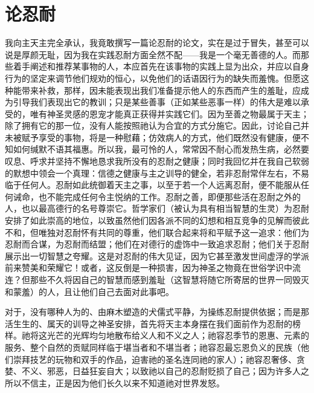 
\chapter{论忍耐}



我向主天主完全承认，我竟敢撰写一篇论忍耐的论文，实在是过于冒失，甚至可以说是厚颜无耻，因为我在实践忍耐方面全然不配——我是一个毫无善德的人。而那些着手阐述和推荐某事物的人，本应首先在该事物的实践上显为出众，并应以自身行为的坚定来调节他们规劝的恒心，以免他们的话语因行为的缺失而羞愧。但愿这种能带来补救，那样，因未能表现出我们准备提示他人的东西而产生的羞耻，应成为引导我们表现出它的教训；只是某些善事（正如某些恶事一样）的伟大是难以承受的，唯有神圣灵感的恩宠才能真正获得并实践它们。因为至善之物最属于天主；除了拥有它的那一位，没有人能按照祂认为合宜的方式分施它。因此，讨论自己并未被赋予享受的事物，将是一种慰藉；仿效病人的方式，他们既然没有健康，便不知如何缄默不语其福惠。所以我，最可怜的人，常常因不耐心而发热生病，必然要叹息、呼求并坚持不懈地恳求我所没有的忍耐之健康；同时我回忆并在我自己软弱的默想中领会一个真理：信德之健康与主之训导的健全，若非忍耐常伴左右，不易临于任何人。忍耐如此统御着天主之事，以至于若一个人远离忍耐，便不能服从任何诫命，也不能完成任何令主悦纳的工作。忍耐之善，即便那些活在忍耐之外的人，也以最高德行的名号尊崇它。哲学家们（被认为具有相当智慧的生灵）为忍耐安排了如此崇高的地位，以致虽然他们因各派不同的幻想和相互竞争的见解而彼此不和，但唯独对忍耐怀有共同的尊重，他们联合起来将和平赋予这一追求：他们为忍耐而合谋，为忍耐而结盟；他们在对德行的虚饰中一致追求忍耐；他们关于忍耐展示出一切智慧之夸耀。这是对忍耐的伟大见证，因为它甚至激发世间虚浮的学派前来赞美和荣耀它！或者，这反倒是一种损害，因为神圣之物竟在世俗学识中流连？但那些不久将因自己的智慧而感到羞耻（这智慧将随它所寄居的世界一同毁灭和蒙羞）的人，且让他们自己去面对此事吧。\par


对于，没有哪种人为的、由麻木塑造的犬儒式平静，为操练忍耐提供依据；而是那活生生的、属天的训导之神圣安排，首先将天主本身摆在我们面前作为忍耐的榜样。祂将这光芒的光辉均匀地散布给义人和不义之人；祂容忍季节的恩惠、元素的服务、整个自然的贡赋同样临于堪当者和不堪当者；祂容忍最忘恩负义的民族（他们崇拜技艺的玩物和双手的作品，迫害祂的圣名连同祂的家人）；祂容忍奢侈、贪婪、不义、邪恶，日益狂妄自大；以致祂以自己的忍耐贬损了自己；因为许多人之所以不信主，正是因为他们长久以来不知道祂对世界发怒。\par

